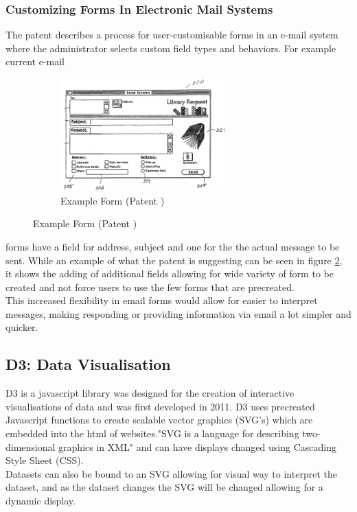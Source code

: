 \documentclass[12pt]{article}  %
\begin{document}
\subsubsection{Customizing Forms In Electronic Mail Systems}
\noindent
The patent  \cite{holt_customizing_2006} describes a process for user-customisable forms in an e-mail system where the administrator selects custom field types and behaviors.  For example current e-mail

\begin{figure}
\vspace*{-\baselineskip}
\begin{figure}[H]
  \includegraphics[width=0.7\textwidth]{images/emailform.png}
	\caption{Example Form (Patent \cite{holt_customizing_2006})}
	\label{fig:emailform}
\end{figure}
\end{figure}

\noindent
forms have a field for address, subject and one for the the actual message to be sent. While an example of what the patent is suggesting can be seen in figure \ref{fig:emailform}, it shows the adding of additional fields allowing for wide variety of form to be created and not force users to use the few forms that are precreated.\\
This increased flexibility in email forms would allow for easier to interpret messages, making responding or providing information via email a lot simpler and quicker.


\subsection{D3: Data Visualisation}
D3 \cite{bostock_d3.js_????} is a javascript library was designed for the creation of interactive visualisations of data and was first developed in 2011. D3 uses precreated Javascript functions to create scalable vector graphics (SVG's) which are embedded into the html of websites."SVG is a language for describing two-dimensional graphics in XML"\cite{ferraiolo_scalable_2000} and can have displays changed  using Cascading Style Sheet (CSS).  \\
Datasets can also be bound to an SVG allowing for visual way to interpret the dataset, and as the dataset changes the SVG will be changed allowing for a dynamic display.  
\end{document}
